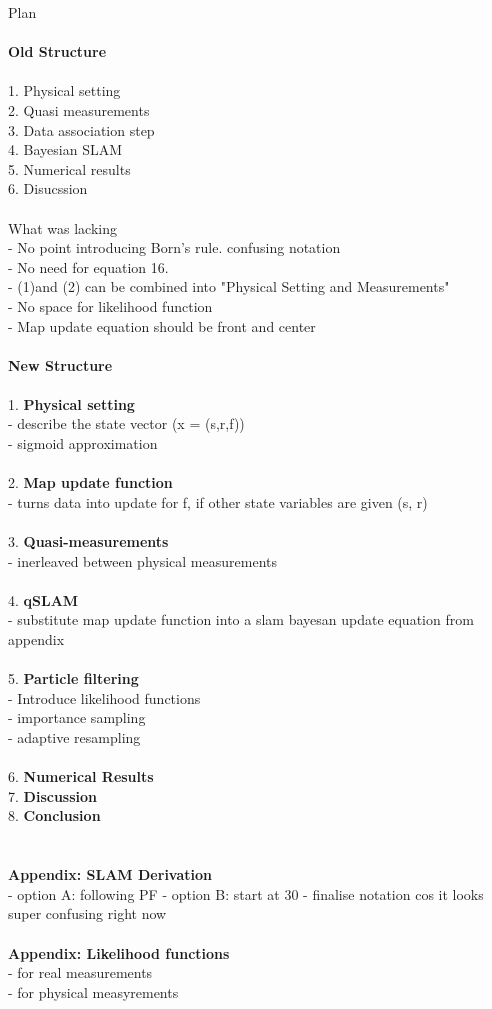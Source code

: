 Plan\\
\\
\textbf{Old Structure } \\ 
\\
1. Physical setting \\ 
2. Quasi measurements \\ 
3. Data association step \\
4. Bayesian SLAM \\
5. Numerical results \\
6. Disucssion \\
\\
What was lacking \\
- No point introducing Born's rule. confusing notation \\ 
- No need for equation 16. \\
- (1)and (2)  can be combined into "Physical Setting and Measurements" \\
- No space for likelihood function\\ 
- Map update equation should be front and center \\
\\
\textbf{New Structure} \\
\\
1. \textbf{Physical setting } \\
- describe the state vector (x = (s,r,f)) \\
- sigmoid approximation \\
\\
2. \textbf{Map update function} \\
- turns data into update for f, if other state variables are given (s, r) \\
\\
3. \textbf{Quasi-measurements} \\
- inerleaved between physical measurements \\
\\
4. \textbf{qSLAM} \\
- substitute map update function into a slam bayesan update equation from appendix  \\
\\
5. \textbf{Particle filtering \\}
- Introduce likelihood functions \\
- importance sampling \\ 
- adaptive resampling \\
\\
6. \textbf{ Numerical Results \\}
7. \textbf{ Discussion \\}
8. \textbf{ Conclusion \\}
\\
\\
\textbf{Appendix: SLAM Derivation \\}
- option A: following PF
- option B: start at 30
- finalise notation cos it looks super confusing right now
\\
\\
\textbf{Appendix: Likelihood functions} \\
- for real measurements \\
- for physical measyrements \\
\\